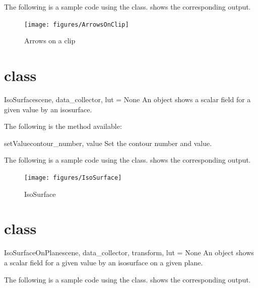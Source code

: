 The following is a sample code using the \ArrowsOnClip class.
 shows the corresponding output.


\begin{figure}[ht]
\begin{center}
\texttt{[image: figures/ArrowsOnClip]}
\end{center}
\caption{Arrows on a clip}
\label{fig:arrowsonclip.1}
\end{figure}


\section{\IsoSurface class}
\begin{classdesc}{IsoSurface}{scene, data_collector, lut = None}
An \IsoSurface object shows a scalar field for a given value by an isosurface.
\end{classdesc}

The following is the method available:

\begin{methoddesc}[IsoSurface]{setValue}{contour_number, value}
Set the contour number and value.
\end{methoddesc}

The following is a sample code using the \IsoSurface class.
 shows the corresponding output.


\begin{figure}[ht]
\begin{center}
\texttt{[image: figures/IsoSurface]}
\end{center}
\caption{IsoSurface}
\label{fig:isosurface.1}
\end{figure}

\section{\IsoSurfaceOnPlane class}
\begin{classdesc}{IsoSurfaceOnPlane}{scene, data_collector, transform, 
lut = None}
An \IsoSurfaceOnPlane object shows a scalar field for a given value 
by an isosurface on a given plane.
\end{classdesc}

The following is a sample code using the \IsoSurfaceOnPlane class.
 shows the corresponding output.


